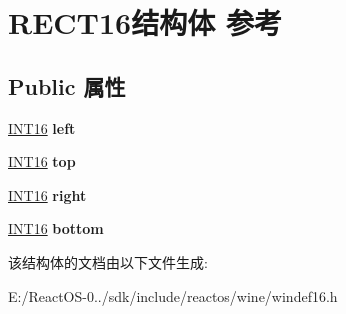 \hypertarget{struct_r_e_c_t16}{}\section{R\+E\+C\+T16结构体 参考}
\label{struct_r_e_c_t16}
\subsection*{Public 属性}
\begin{DoxyCompactItemize}
\item 
\mbox{\label{struct_r_e_c_t16_a6c715b64ca45b047d8719daa240ea78c}} 
\hyperlink{_processor_bind_8h_a30f500129d8c688af07726d5d34ce52d}{I\+N\+T16} {\bfseries left}
\item 
\mbox{\label{struct_r_e_c_t16_aa35d02385dd935a7517519cc7df9e205}} 
\hyperlink{_processor_bind_8h_a30f500129d8c688af07726d5d34ce52d}{I\+N\+T16} {\bfseries top}
\item 
\mbox{\label{struct_r_e_c_t16_aa984f20587e38a6b093b37d8b8c06cdf}} 
\hyperlink{_processor_bind_8h_a30f500129d8c688af07726d5d34ce52d}{I\+N\+T16} {\bfseries right}
\item 
\mbox{\label{struct_r_e_c_t16_a71ff5a4d74af29c4a4c675919d1202c7}} 
\hyperlink{_processor_bind_8h_a30f500129d8c688af07726d5d34ce52d}{I\+N\+T16} {\bfseries bottom}
\end{DoxyCompactItemize}


该结构体的文档由以下文件生成\+:\begin{DoxyCompactItemize}
\item 
E\+:/\+React\+O\+S-\/0../sdk/include/reactos/wine/windef16.\+h\end{DoxyCompactItemize}
